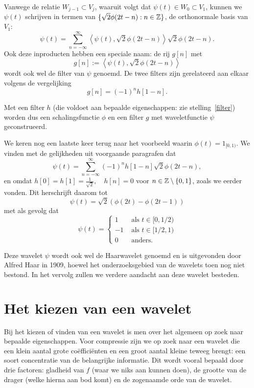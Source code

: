 Vanwege de relatie $W_{j-1} \subset V_{j}$, waaruit volgt dat $\psi(t) \in W_0 \subset V_1$,
kunnen we $\psi(t)$ schrijven in termen van  $\{ \sqrt{2}\phi(2t-n): n \in \mathbb{Z} \}$, de orthonormale basis van $V_1$: 
\[
\psi\left(t\right) = \sum_{n=-\infty}^{\infty} \left\langle \psi\left(t\right), \sqrt{2}\phi(2t-n) \right\rangle \sqrt{2}\phi(2t-n).
\]
Ook deze inproducten hebben een speciale naam: de rij $g[n]$ met
\[
g[n] := \left\langle \psi\left(t\right), \sqrt{2}\phi(2t-n) \right\rangle
\]
wordt ook wel de filter van $\psi$ genoemd. 
De twee filters zijn gerelateerd aan elkaar volgens de vergelijking \cite[V13]{wavelet_filter}\cite[P958]{daubechies}
\begin{equation}
\label{highpassfilter}
g[n] = (-1)^{n}h[1-n].
\end{equation}

Met een filter $h$ (die voldoet aan bepaalde eigenschappen: zie stelling~\ref{filter}) worden dus een schalingsfunctie $\phi$ en een filter $g$ met waveletfunctie $\psi$ geconstrueerd.

\begin{voorbeeld}
  We keren nog een laatste keer terug naar het voorbeeld waarin $\phi(t) = 1_{[0,1)}$. 
    We vinden met de gelijkheden uit voorgaande paragrafen dat
    \[
    \psi\left(t\right) = \sum_{n=-\infty}^{\infty} (-1)^{n}h[1-n] \sqrt{2}\phi(2t-n),
    \]
    en omdat $h[0] = h[1] = \frac 1 {\sqrt{2}},\quad h[n] = 0$ voor $n \in \mathbb{Z} \setminus \{0,1\}$, 
    zoals we eerder vonden. Dit herschrijft daarom tot
    \[
    \psi\left(t\right) = \sqrt{2}\left(\phi(2t) - \phi(2t - 1)\right)
    \]
    met als gevolg dat
    \[
    \psi(t) = \begin{cases} 1 & \text{ als } t \in [0,1/2) \\ -1 & \text{ als } t \in [1/2,1) \\ 0 & \text{ anders.} \end{cases}
    \]

    Deze wavelet $\psi$ wordt ook wel de Haarwavelet genoemd en is uitgevonden door Alfred Haar in 1909, hoewel het onderzoeksgebied van de wavelets toen nog niet bestond. In het vervolg zullen we verdere aandacht aan deze wavelet besteden.
\end{voorbeeld}

\section{Het kiezen van een wavelet}
Bij het kiezen of vinden van een wavelet is men over het algemeen op zoek naar bepaalde eigenschappen. Voor compressie zijn we op zoek naar een wavelet die een klein aantal grote co\"effici\"enten en een groot aantal kleine teweeg brengt: een soort concentratie van de belangrijke informatie. Dit wordt vooral bepaald door drie factoren: gladheid van $f$ (waar we niks aan kunnen doen), de grootte van de drager (welke hierna aan bod komt) en de zogenaamde orde van de wavelet.

